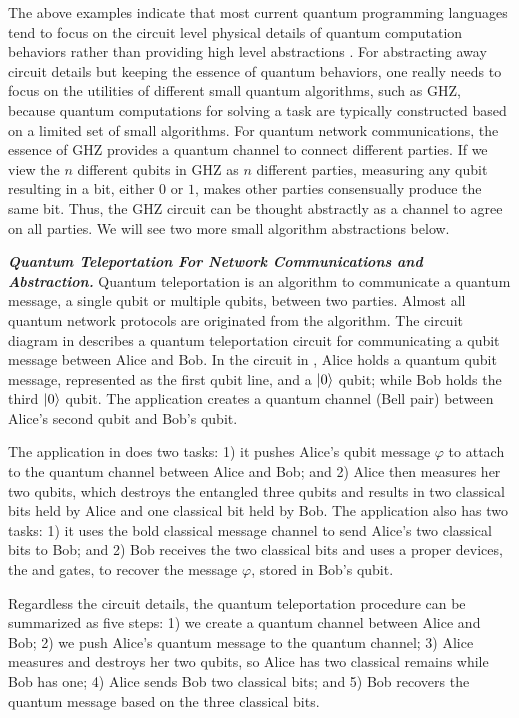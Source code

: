 The above examples indicate that most current quantum programming languages tend to focus on the circuit level physical details of quantum computation behaviors rather than providing high level abstractions \cite{VOQC}.
For abstracting away circuit details but keeping the essence of quantum behaviors,
one really needs to focus on the utilities of different small quantum algorithms, such as GHZ,
because quantum computations for solving a task are typically constructed based on a limited set of small algorithms.
For quantum network communications, the essence of GHZ provides a quantum channel to connect different parties.
If we view the $n$ different qubits in GHZ as $n$ different parties,
measuring any qubit resulting in a bit, either $0$ or $1$, makes other parties consensually produce the same bit.
Thus, the GHZ circuit can be thought abstractly as a channel to agree on all parties.
We will see two more small algorithm abstractions below.

\noindent\textbf{\textit{Quantum Teleportation For Network Communications and Abstraction.}}
Quantum teleportation \cite{PhysRevLett.70.1895,Rigolin_2005} is an algorithm to communicate a quantum message, a single qubit or multiple qubits, between two parties.
Almost all quantum network protocols are originated from the algorithm.
The circuit diagram in  describes a quantum teleportation circuit for communicating a qubit message between Alice and Bob.
In the circuit in ,
Alice holds a quantum qubit message, represented as the first qubit line, and a $\ket{0}$ qubit;
while Bob holds the third $\ket{0}$ qubit.
The application  creates a quantum channel (Bell pair) between Alice's second qubit and Bob's qubit.

The  application in  does two tasks: 1) it pushes Alice's qubit message $\varphi$ to attach to the quantum channel between Alice and Bob; and 2) Alice then measures her two qubits, which destroys the entangled three qubits and results in two classical bits held by Alice and one classical bit held by Bob.
The  application also has two tasks: 1) it uses the bold classical message channel to send Alice's two classical bits to Bob; and 2) Bob receives the two classical bits and uses a proper devices, the  and  gates, to recover the message $\varphi$, stored in Bob's qubit.

Regardless the circuit details, the quantum teleportation procedure can be summarized as five steps:
1) we create a quantum channel between Alice and Bob;
2) we push Alice's quantum message to the quantum channel;
3) Alice measures and destroys her two qubits, so Alice has two classical remains while Bob has one;
4) Alice sends Bob two classical bits;
and 5) Bob recovers the quantum message based on the three classical bits.

